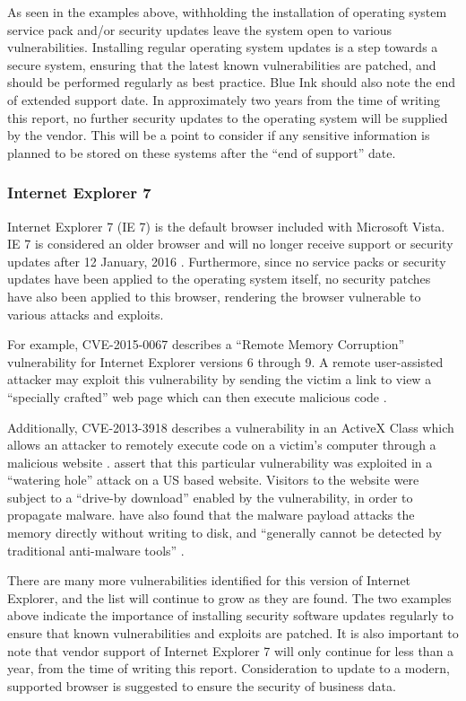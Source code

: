 As seen in the examples above, withholding the installation of operating system service pack and/or security updates leave the system open to various vulnerabilities. Installing regular operating system updates is a step towards a secure system, ensuring that the latest known vulnerabilities are patched, and should be performed regularly as best practice. Blue Ink should also note the end of extended support date. In approximately two years from the time of writing this report, no further security updates to the operating system will be supplied by the vendor. This will be a point to consider if any sensitive information is planned to be stored on these systems after the ``end of support'' date.

\subsubsection{Internet Explorer 7}

Internet Explorer 7 (IE 7) is the default browser included with Microsoft Vista. IE 7 is considered an older browser and will no longer receive support or security updates after 12 January, 2016 \citep{Capriotti2014}. Furthermore, since no service packs or security updates have been applied to the operating system itself, no security patches have also been applied to this browser, rendering the browser vulnerable to various attacks and exploits.

For example, CVE-2015-0067 describes a ``Remote Memory Corruption'' vulnerability for Internet Explorer versions 6 through 9. A remote user-assisted attacker may exploit this vulnerability by sending the victim a link to view a ``specially crafted'' web page which can then execute malicious code \citep{SecurityFocus2015}.

Additionally, CVE-2013-3918 describes a vulnerability in an ActiveX Class which allows an attacker to remotely execute code on a victim's computer through a malicious website \citep{Ozkan2013, Microsoft2013}. \citet{Chen2013} assert that this particular vulnerability was exploited in a ``watering hole'' attack on a US based website. Visitors to the website were subject to a ``drive-by download'' enabled by the vulnerability, in order to propagate malware. \citet{Moran2013} have also found that the malware payload attacks the memory directly without writing to disk, and ``generally cannot be detected by traditional anti-malware tools'' \citep{Wilson2013}.

There are many more vulnerabilities identified for this version of Internet Explorer, and the list will continue to grow as they are found. The two examples above indicate the importance of installing security software updates regularly to ensure that known vulnerabilities and exploits are patched. It is also important to note that vendor support of Internet Explorer 7 will only continue for less than a year, from the time of writing this report. Consideration to update to a modern, supported browser is suggested to ensure the security of business data.

